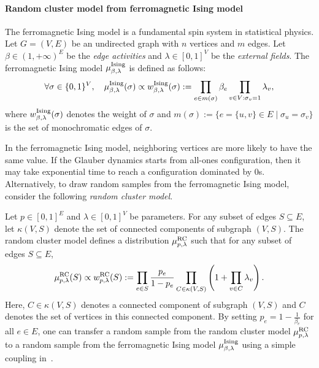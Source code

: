 \documentclass[11pt,a4paper]{article}
\theoremstyle{definition}
\begin{document}
\paragraph{Random cluster model from ferromagnetic Ising model}
The ferromagnetic Ising model is a fundamental spin system in statistical physics. 
Let $G=(V,E)$ be an undirected graph with $n$ vertices and $m$ edges. Let $\beta \in (1,+\infty)^E$ be the \emph{edge activities} and $\lambda\in [0,1]^V$ be the \emph{external fields}. The ferromagnetic Ising model $\mu_{\beta,\lambda}^{\textnormal{Ising}}$ is defined as follows: 
\begin{align*}
\forall \sigma \in \{0,1\}^V,\quad    \mu_{\beta,\lambda}^{\textnormal{Ising}}(\sigma) \propto w_{\beta,\lambda}^{\textnormal{Ising}}(\sigma) := \prod_{e\in m(\sigma)}\beta_e\prod_{v\in V: \sigma_v = 1}\lambda_v, 
\end{align*}
where $w_{\beta,\lambda}^{\textnormal{Ising}}(\sigma)$ denotes the weight of $\sigma$ and $m(\sigma):=\{e = \{u,v\}\in E \mid \sigma_u = \sigma_v\}$ is the set of monochromatic edges of $\sigma$.

In the ferromagnetic Ising model, neighboring vertices are more likely to have the same value. If the Glauber dynamics starts from all-ones configuration, then it may take exponential time to reach a configuration dominated by 0s. Alternatively, to draw random samples from the ferromagnetic Ising model, consider the following \emph{random cluster model}. 

Let $p\in [0,1]^E$ and $\lambda\in [0,1]^V$ be parameters.
For any subset of edges $S \subseteq E$, let $\kappa(V,S)$ denote the set of connected components of subgraph $(V,S)$. The random cluster model defines a distribution $\mu_{p,\lambda}^{\textnormal{RC}}$ such that for any subset of edges $S \subseteq E$,
\begin{align}\label{eq:weight-rc}
    \mu_{p,\lambda}^{\textnormal{RC}}(S) \propto w_{p,\lambda}^{\textnormal{RC}}(S) := \prod_{e\in S}\frac{p_e}{1-p_e} \prod_{C\in \kappa(V,S)}\left(1+\prod_{v\in C}\lambda_v\right).
\end{align}
Here, $C \in \kappa(V,S)$ denotes a connected component of subgraph $(V,S)$ and $C$ denotes the set of vertices in this connected component.
By setting $p_e = 1 - \frac{1}{\beta_e}$ for all $e \in E$,
one can transfer a random sample from the random cluster model $ \mu_{p,\lambda}^{\textnormal{RC}}$ to a random sample from the ferromagnetic Ising model  $\mu_{\beta,\lambda}^{\textnormal{Ising}}$ using a simple coupling in~\cite{JerrumS93,feng2023swendsen}.
\end{document}
